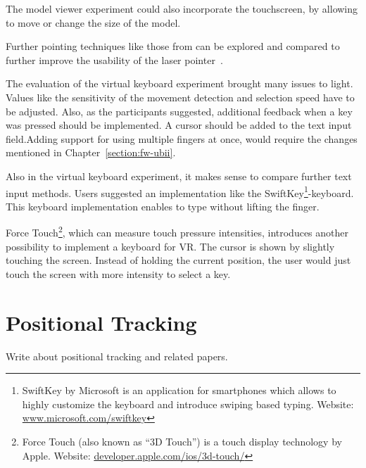 The model viewer experiment could also incorporate the touchscreen, by allowing to move or change the size of the model.

Further pointing techniques like those from \citeauthor{Argelaguet.2013} can be explored and compared to further improve the usability of the laser pointer~\cite{Argelaguet.2013}.

The evaluation of the virtual keyboard experiment brought many issues to light. 
Values like the sensitivity of the movement detection and selection speed have to be adjusted. Also, as the participants suggested, additional feedback when a key was pressed should be implemented. A cursor should be added to the text input field.Adding support for using multiple fingers at once, would require the changes mentioned in Chapter~\ref{section:fw-ubii}.

Also in the virtual keyboard experiment, it makes sense to compare further text input methods. Users suggested an implementation like the SwiftKey\footnote{SwiftKey by Microsoft is an application for smartphones which allows to highly customize the keyboard and introduce swiping based typing. Website: \href{https://www.microsoft.com/swiftkey}{www.microsoft.com/swiftkey}}-keyboard. This keyboard implementation enables to type without lifting the finger. 

Force Touch\footnote{Force Touch (also known as \enquote{3D Touch}) is a touch display technology by Apple. Website: \href{https://developer.apple.com/ios/3d-touch/}{developer.apple.com/ios/3d-touch/}}, which can measure touch pressure intensities, introduces another possibility to implement a keyboard for \ac{VR}. The cursor is shown by slightly touching the screen. Instead of holding the current position, the user would just touch the screen with more intensity to select a key. 


\section{Positional Tracking}\label{section:fw-positional-tracking}

Write about positional tracking and related papers.